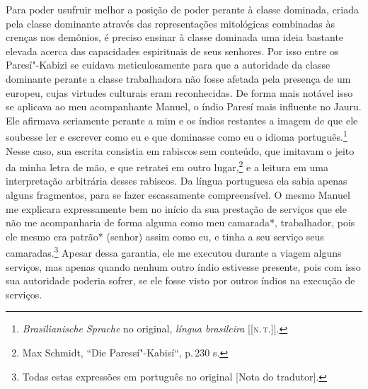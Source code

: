 Para poder usufruir melhor a posição de poder perante à classe dominada,
criada pela classe dominante através das representações mitológicas
combinadas às crenças nos demônios, é preciso ensinar à classe dominada
uma ideia bastante elevada acerca das capacidades espirituais de seus
senhores. Por isso entre os Paresí"-Kabizi se cuidava meticulosamente
para que a autoridade da classe dominante perante a classe trabalhadora
não fosse afetada pela presença de um europeu, cujas virtudes culturais
eram reconhecidas. De forma mais notável isso se aplicava ao meu
acompanhante Manuel, o índio Paresí mais influente no Jauru. Ele
afirmava seriamente perante a mim e os índios restantes a imagem de que
ele soubesse ler e escrever como eu e que dominasse como eu o idioma
português.\footnote{\textit{Brasilianische Sprache} no original, \textit{língua
  brasileira} {[}{[}\textsc{n.\,t.}{]}{]}.} Nesse caso, sua escrita consistia em rabiscos sem conteúdo,
que imitavam o jeito da minha letra de mão, e que retratei em outro
lugar,\footnote{Max Schmidt, ``Die Paressí"-Kabisí``, p.\,230 s.} e a leitura em uma interpretação arbitrária desses
rabiscos. Da língua portuguesa ela sabia apenas alguns fragmentos, para
se fazer escassamente compreensível. O mesmo Manuel me explicara
expressamente bem no início da sua prestação de serviços que ele não me
acompanharia de forma alguma como meu camarada*, trabalhador, pois ele
mesmo era patrão* (senhor) assim como eu, e tinha a seu serviço seus
camaradas.\footnote{Todas estas expressões em português no original {[}Nota do
  tradutor{]}.} Apesar dessa garantia, ele me executou durante a viagem
alguns serviços, mas apenas quando nenhum outro índio estivesse
presente, pois com isso sua autoridade poderia sofrer, se ele fosse
visto por outros índios na execução de serviços.

